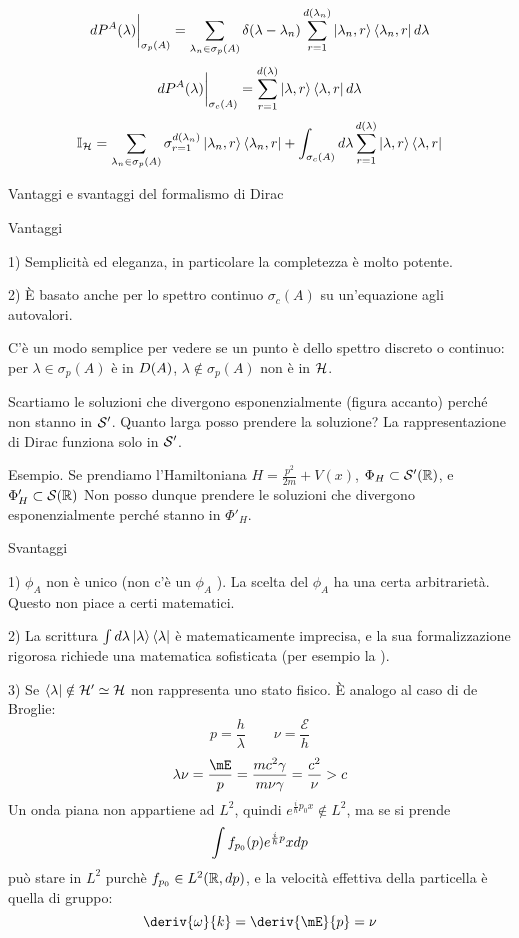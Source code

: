 \documentclass[../../FisicaTeorica.tex]{subfiles}
\begin{document}
\[
d P^A(\lambda) \bigg|_{\sigma_p(A)} = \sum_{\lambda_n \in \sigma_p(A)} \delta(\lambda - \lambda_n) \sum_{r = 1}^{d(\lambda_n)} \ket{\lambda_n, r} \bra{\lambda_n, r} d \lambda
\]
\[
d P^A(\lambda) \bigg|_{\sigma_c(A)} = \sum_{r = 1}^{d(\lambda)} \ket{\lambda, r} \bra{\lambda, r} d\lambda
\]
\[
{\mathbb I}_{\mathcal{H}} = \sum_{\lambda_n \in \sigma_p(A)} \sigma_{r = 1}^{d(\lambda_n)} \ket{\lambda_n, r} \bra{\lambda_n, r} + \int_{\sigma_c(A)} d\lambda \sum_{r = 1}^{d(\lambda)} \ket{\lambda,r} \bra{\lambda,r}
\]

Vantaggi e svantaggi del formalismo di Dirac

Vantaggi 

1) Semplicità ed eleganza, in particolare la completezza è molto potente.

2) È basato anche per lo spettro continuo $\sigma_c(A)$ su un'equazione agli autovalori.

C'è un modo semplice per vedere se un punto è dello spettro discreto o continuo: per $\lambda \in \sigma_p(A)$ è in $D(A)$, $\lambda \notin \sigma_p(A)$ non è in $\mathcal{H}$.

Scartiamo le soluzioni che divergono esponenzialmente (figura accanto) perché non stanno in $\mathcal S'$. Quanto larga posso prendere la soluzione? La rappresentazione di Dirac funziona solo in $\mathcal S'$.

Esempio. Se prendiamo l'Hamiltoniana $H = \frac{p^2}{2m} + V(x)$, $\Phi_H \subset \mathcal S'(\mathbb R)$, e $\Phi'_H \subset \mathcal S(\mathbb R)$
Non posso dunque prendere le soluzioni che divergono esponenzialmente perché stanno in $\Phi'_H$.

Svantaggi

1) $\phi_A$ non è unico (non c'è un $\phi_A$ ). La scelta del $\phi_A$ ha una certa arbitrarietà. Questo non piace a certi matematici.

2) La scrittura $\int d\lambda \ket\lambda\bra\lambda$ è matematicamente imprecisa, e la sua formalizzazione rigorosa richiede una matematica sofisticata (per esempio la ).

3) Se $\bra\lambda \notin \mathcal{H}' \simeq \mathcal{H}$ non rappresenta uno stato fisico.
È analogo al caso di de Broglie:
\[
p = \frac{h}{\lambda} \qquad \nu = \frac{\mathcal E}{h}
\]
\[
\lambda \nu = \frac{\mE}{p} = \frac{m c^2 \gamma}{m \nu \gamma} = \frac{c^2}{\nu} > c
\]
Un onda piana non appartiene ad $L^2$, quindi $e^{\frac{i}{\hbar}p_0 x} \notin L^2$, ma se si prende
\[
\int f_{p_0}(p) e^{\frac{i}{\hbar} p} x d p
\]
può stare in $L^2$ purchè $f_{p_0} \in L^2(\mathbb R, d p)$, e la velocità effettiva della particella è quella di gruppo:
\[
\deriv{\omega}{k} = \deriv{\mE}{p} = \nu
\]
\end{document}
